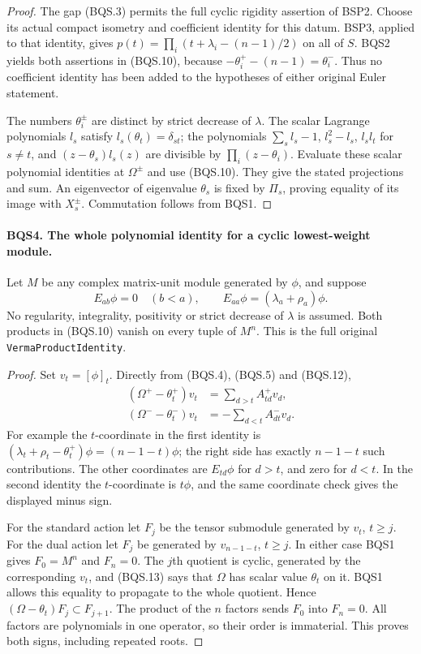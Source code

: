 \documentclass[11pt,a4paper]{article}
\numberwithin{equation}{section}
\theoremstyle{remark}\newtheorem{remark}[theorem]{Remark}
\begin{document}
\begin{proof}
The gap (BQS.3) permits the full cyclic rigidity assertion of BSP2.
Choose its actual compact isometry and coefficient identity for this
datum.  BSP3, applied to that identity, gives
$p(t)=\prod_i(t+\lambda_i-(n-1)/2)$ on all of $S$.
BQS2 yields both assertions in (BQS.10), because
$-\theta_i^+-(n-1)=\theta_i^-$.
Thus no coefficient identity has been added to the hypotheses of
either original Euler statement.

The numbers $\theta_i^\pm$ are distinct by strict decrease of $\lambda$.
The scalar Lagrange polynomials $l_s$ satisfy
$l_s(\theta_t)=\delta_{st}$; the polynomials
$\sum_s l_s-1$, $l_s^2-l_s$, $l_sl_t$ for $s\ne t$, and
$(z-\theta_s)l_s(z)$ are divisible by
$\prod_i(z-\theta_i)$.  Evaluate these scalar polynomial identities
at $\Omega^\pm$ and use (BQS.10).
They give the stated projections and sum.  An eigenvector of eigenvalue
$\theta_s$ is fixed by $\Pi_s$, proving equality of its image with
$X_s^\pm$.  Commutation follows from BQS1.
\end{proof}

\paragraph{BQS4. The whole polynomial identity for a cyclic lowest-weight module.}
\label{claim:BQS4}
Let $M$ be any complex matrix-unit module generated by $\phi$, and suppose
\[
 E_{ab}\phi=0\quad(b<a),\qquad
 E_{aa}\phi=(\lambda_a+\rho_a)\phi.
 \tag{BQS.12}
\]
No regularity, integrality, positivity or strict decrease of $\lambda$
is assumed.  Both products in (BQS.10) vanish on every tuple of $M^n$.
This is the full original \texttt{Verma\allowbreak Product\allowbreak Identity}.

\begin{proof}
Set $v_t=[\phi]_t$.  Directly from (BQS.4), (BQS.5) and (BQS.12),
\[
\begin{aligned}
 (\Omega^+-\theta_t^+)v_t
    &=\sum_{d>t}A^+_{td}v_d,\\
 (\Omega^--\theta_t^-)v_t
    &=-\sum_{d<t}A^-_{dt}v_d .
\end{aligned}
\tag{BQS.13}
\]
For example the $t$-coordinate in the first identity is
$(\lambda_t+\rho_t-\theta_t^+)\phi=(n-1-t)\phi$;
the right side has exactly $n-1-t$ such contributions.  The other
coordinates are $E_{td}\phi$ for $d>t$, and zero for $d<t$.
In the second identity the $t$-coordinate is $t\phi$, and the same
coordinate check gives the displayed minus sign.

For the standard action let $F_j$ be the tensor submodule generated by
$v_t$, $t\ge j$.  For the dual action let $F_j$ be generated by
$v_{n-1-t}$, $t\ge j$.  In either case BQS1 gives $F_0=M^n$ and
$F_n=0$.  The $j$th quotient is cyclic, generated by the corresponding
$v_t$, and (BQS.13) says that $\Omega$ has scalar value $\theta_t$
on it.  BQS1 allows this equality to propagate to the whole quotient.
Hence $(\Omega-\theta_t)F_j\subset F_{j+1}$.
The product of the $n$ factors sends $F_0$ into $F_n=0$.
All factors are polynomials in one operator, so their order is
immaterial.  This proves both signs, including repeated roots.
\end{proof}
\end{document}
